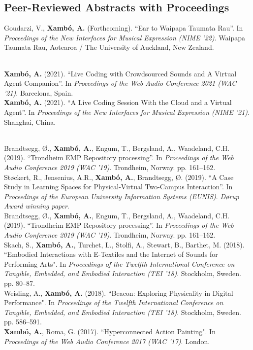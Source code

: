 \documentclass[10pt, a4paper]{article}
\newcommand{\years}[1]{\marginnote{\scriptsize #1}}
\begin{document}
{{\subsection*{Peer-Reviewed Abstracts with Proceedings}
\noindent
\years{2022}Goudarzi, V., \textbf{Xambó, A.} (Forthcoming). ``Ear to Waipapa Taumata Rau''. In \emph{Proceedings of the New Interfaces for Musical Expression (NIME '22)}. Waipapa Taumata Rau, Aotearoa / The University of Auckland, New Zealand.}\\
\years{2021b}\textbf{Xambó, A.} (2021). ``Live Coding with Crowdsourced Sounds and A Virtual Agent Companion''. In \emph{Proceedings of the Web Audio Conference 2021 (WAC '21)}. Barcelona, Spain.\\
\years{2021a}\textbf{Xambó, A.} (2021). ``A Live Coding Session With the Cloud and a Virtual Agent''. In \emph{Proceedings of the New Interfaces for Musical Expression (NIME '21)}. Shanghai, China.}\\
\years{2019b}Brandtsegg, Ø., \textbf{Xambó, A.}, Engum, T., Bergsland, A., Waadeland, C.H. (2019). ``Trondheim EMP Repository processing''. In \emph{Proceedings of the Web Audio Conference 2019 (WAC '19)}. Trondheim, Norway. pp. 161--162.\\
\years{2019a}Støckert, R., Jensenius, A.R., \textbf{Xambó, A.}, Brandtsegg, Ø. (2019). ``A Case Study in Learning Spaces for Physical-Virtual Two-Campus Interaction''. In \emph{Proceedings of the European University Information Systems (EUNIS)}. \emph{Dørup Award winning paper}.\\ 
Brandtsegg, Ø., \textbf{Xambó, A.}, Engum, T., Bergsland, A., Waadeland, C.H. (2019). ``Trondheim EMP Repository processing''. In \emph{Proceedings of the Web Audio Conference 2019 (WAC '19)}. Trondheim, Norway. pp. 161--162.\\
\years{2018b}Skach, S., \textbf{Xambó, A.}, Turchet, L., Stolfi, A., Stewart, B., Barthet, M. (2018). “Embodied Interactions with E-Textiles and the Internet of Sounds for Performing Arts". In \emph{Proceedings of the Twelfth International Conference on Tangible, Embedded, and Embodied Interaction (TEI '18)}. Stockholm, Sweden. pp. 80--87.\\
\years{2018a}Weisling, A., \textbf{Xambó, A.} (2018). “Beacon: Exploring Physicality in Digital Performance". In \emph{Proceedings of the Twelfth International Conference on Tangible, Embedded, and Embodied Interaction (TEI '18)}. Stockholm, Sweden. pp. 586--591.\\
\years{2017a}\textbf{Xambó, A.}, Roma, G. (2017). “Hyperconnected Action Painting". In \emph{Proceedings of the Web Audio Conference 2017 (WAC '17)}. London.\\
\end{document}
